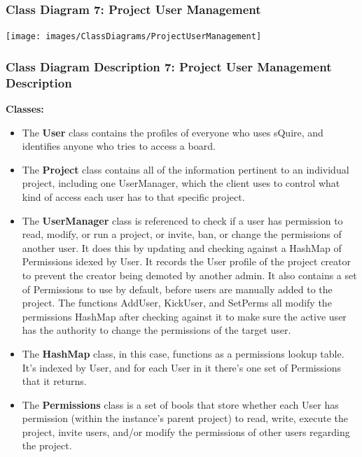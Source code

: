 \documentclass[twoside,letterpaper]{article}
\begin{document}
	\newpage
	\subsubsection[Class Diagram 7: Project User Management]{\rmfamily\bfseries\color{black}
		Class Diagram 7: Project User Management}
	\hypertarget{RefHeading22059017292}{}
	\bigskip
	
	\texttt{[image: images/ClassDiagrams/ProjectUserManagement]}
	
	\newpage
	
	\subsubsection[Class Diagram Description 7: Project User Management Description]{\rmfamily\bfseries\color{black}
		Class Diagram Description 7: Project User Management Description}
	\hypertarget{RefHeading22059017292}{}
	
	\textbf{Classes:}
	\begin{itemize}
	
		\item The \textbf{User} class contains the profiles of everyone who uses sQuire, and identifies anyone who tries to access a board.
		\item The \textbf{Project} class contains all of the information pertinent to an individual project, including one UserManager, which the client uses to control what kind of access each user has to that specific project.
		\item The \textbf{UserManager} class is referenced to check if a user has permission to read, modify, or run a project, or invite, ban, or change the permissions of another user. It does this by updating and checking against a HashMap of Permissions idexed by User. It records the User profile of the project creator to prevent the creator being demoted by another admin. It also contains a set of Permissions to use by default, before users are manually added to the project.
		The functions AddUser, KickUser, and SetPerms all modify the permissions HashMap after checking against it to make sure the active user has the authority to change the permissions of the target user.
		\item The \textbf{HashMap} class, in this case, functions as a permissions lookup table. It's indexed by User, and for each User in it there's one set of Permissions that it returns.
		\item The \textbf{Permissions} class is a set of bools that store whether each User has permission (within the instance's parent project) to read, write, execute the project, invite users, and/or modify the permissions of other users regarding the project.
	\end{itemize}
	
\end{document}
